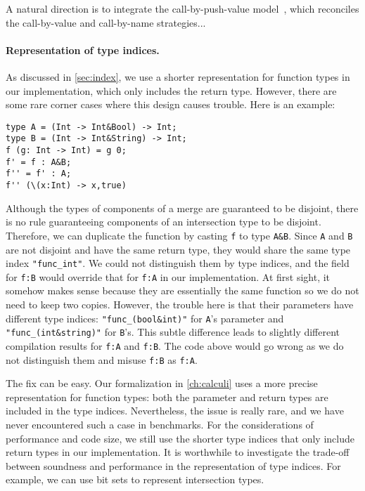A natural direction is to integrate the call-by-push-value
model~\citep{levy2012call}, which reconciles the call-by-value and call-by-name
strategies...

\paragraph{Representation of type indices.}
As discussed in \autoref{sec:index}, we use a shorter representation for
function types in our implementation, which only includes the return type.
However, there are some rare corner cases where this design causes trouble. Here
is an example:
\begin{lstlisting}
type A = (Int -> Int&Bool) -> Int;
type B = (Int -> Int&String) -> Int;
f (g: Int -> Int) = g 0;
f' = f : A&B;
f'' = f' : A;
f'' (\(x:Int) -> x,true)
\end{lstlisting}
Although the types of components of a merge are guaranteed to be disjoint, there
is no rule guaranteeing components of an intersection type to be disjoint.
Therefore, we can duplicate the function by casting \lstinline{f} to type
\lstinline{A&B}. Since \lstinline{A} and \lstinline{B} are not disjoint and have
the same return type, they would share the same type index
\lstinline{"func_int"}. We could not distinguish them by type indices, and the
field for \lstinline{f:B} would override that for \lstinline{f:A} in our
implementation. At first sight, it somehow makes sense because they are
essentially the same function so we do not need to keep two copies. However, the
trouble here is that their parameters have different type indices:
\lstinline{"func_(bool&int)"} for \lstinline{A}'s parameter and
\lstinline{"func_(int&string)"} for \lstinline{B}'s. This subtle difference
leads to slightly different compilation results for \lstinline{f:A} and
\lstinline{f:B}. The code above would go wrong as we do not distinguish them and
misuse \lstinline{f:B} as \lstinline{f:A}.

The fix can be easy. Our formalization in \autoref{ch:calculi} uses a more
precise representation for function types: both the parameter and return types
are included in the type indices. Nevertheless, the issue is really rare, and we
have never encountered such a case in benchmarks. For the considerations of
performance and code size, we still use the shorter type indices that only
include return types in our implementation. It is worthwhile to investigate the
trade-off between soundness and performance in the representation of type
indices. For example, we can use bit sets to represent intersection types.

